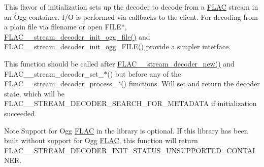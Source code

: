 This flavor of initialization sets up the decoder to decode from a \hyperlink{namespace_f_l_a_c}{F\+L\+AC} stream in an Ogg container. I/O is performed via callbacks to the client. For decoding from a plain file via filename or open F\+I\+L\+E$\ast$, \hyperlink{group__flac__stream__decoder_ga609f2a43987d6abeaef654575462030c}{F\+L\+A\+C\+\_\+\+\_\+stream\+\_\+decoder\+\_\+init\+\_\+ogg\+\_\+file()} and \hyperlink{group__flac__stream__decoder_gac6a35b1db07e057ec9912f637b37dd74}{F\+L\+A\+C\+\_\+\+\_\+stream\+\_\+decoder\+\_\+init\+\_\+ogg\+\_\+\+F\+I\+L\+E()} provide a simpler interface.

This function should be called after \hyperlink{group__flac__stream__decoder_ga7159eefc074dfbab4a37462f69326091}{F\+L\+A\+C\+\_\+\+\_\+stream\+\_\+decoder\+\_\+new()} and F\+L\+A\+C\+\_\+\+\_\+stream\+\_\+decoder\+\_\+set\+\_\+$\ast$() but before any of the F\+L\+A\+C\+\_\+\+\_\+stream\+\_\+decoder\+\_\+process\+\_\+$\ast$() functions. Will set and return the decoder state, which will be F\+L\+A\+C\+\_\+\+\_\+\+S\+T\+R\+E\+A\+M\+\_\+\+D\+E\+C\+O\+D\+E\+R\+\_\+\+S\+E\+A\+R\+C\+H\+\_\+\+F\+O\+R\+\_\+\+M\+E\+T\+A\+D\+A\+TA if initialization succeeded.

\begin{DoxyNote}{Note}
Support for Ogg \hyperlink{namespace_f_l_a_c}{F\+L\+AC} in the library is optional. If this library has been built without support for Ogg \hyperlink{namespace_f_l_a_c}{F\+L\+AC}, this function will return {\ttfamily F\+L\+A\+C\+\_\+\+\_\+\+S\+T\+R\+E\+A\+M\+\_\+\+D\+E\+C\+O\+D\+E\+R\+\_\+\+I\+N\+I\+T\+\_\+\+S\+T\+A\+T\+U\+S\+\_\+\+U\+N\+S\+U\+P\+P\+O\+R\+T\+E\+D\+\_\+\+C\+O\+N\+T\+A\+I\+N\+ER}.
\end{DoxyNote}

